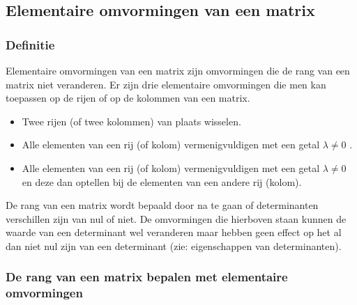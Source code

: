 \subsection{Elementaire omvormingen van een matrix}

\subsubsection{Definitie}

	
\begin{definitie}
	Elementaire omvormingen van een matrix zijn omvormingen die de rang van een matrix niet veranderen. Er zijn drie elementaire omvormingen die men kan toepassen op de rijen of op de kolommen van een matrix.
\begin{itemize}
	\item Twee rijen (of twee kolommen) van plaats wisselen.
	\item Alle elementen van een rij (of kolom) vermenigvuldigen met een getal $\lambda \neq 0$ .
	\item Alle elementen van een rij (of kolom) vermenigvuldigen met een getal $\lambda \neq 0$ en deze dan optellen bij de elementen van een andere rij (kolom).
\end{itemize}

\end{definitie}


\begin{opmerking}
De rang van een matrix wordt bepaald door na te gaan of  determinanten verschillen zijn van nul of niet. De omvormingen die hierboven staan kunnen de waarde van een determinant wel veranderen maar hebben geen effect op het al dan niet nul zijn van een determinant (zie: eigenschappen van determinanten).
\end{opmerking}

\subsubsection{De rang van een matrix bepalen met elementaire omvormingen}

